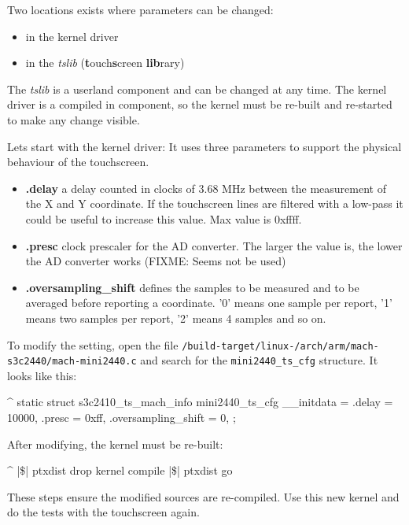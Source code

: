 Two locations exists where parameters can be changed:

\begin{itemize}
	\item in the kernel driver
	\item in the \textit{tslib} (\textbf{t}ouch\textbf{s}creen \textbf{lib}rary)
\end{itemize}

The \textit{tslib} is a userland component and can be changed at any time.
The kernel driver is a compiled in component, so the kernel must be re-built
and re-started to make any change visible.

Lets start with the kernel driver: It uses three parameters to support the
physical behaviour of the touchscreen.

\begin{itemize}
	\item \textbf{.delay} a delay counted in clocks of 3.68 MHz between
		the measurement of the X and Y coordinate. If the touchscreen
		lines are filtered with a low-pass it could be useful to
		increase this value. Max value is 0xffff.
	\item \textbf{.presc} clock prescaler for the AD converter. The larger the
		value is, the lower the AD converter works (FIXME: Seems not be
		used)
	\item \textbf{.oversampling\_shift} defines the samples to be measured and
		to be averaged before reporting a coordinate. '0' means one sample per
		report, '1' means two samples per report, '2' means 4 samples and
		so on.
\end{itemize}

To modify the setting, open the file
\texttt{\ptxdistPlatformDir /build-target/linux-\curKernelRev /arch/arm/mach-s3c2440/mach-mini2440.c}
and search for the \texttt{mini2440\_ts\_cfg} structure. It looks like this:

\begin{ptxshell}[escapechar=|]{^}
static struct s3c2410_ts_mach_info mini2440_ts_cfg __initdata = {
	.delay = 10000,
	.presc = 0xff,
	.oversampling_shift = 0,
};
\end{ptxshell}

After modifying, the kernel must be re-built:

\begin{ptxshell}[escapechar=|]{^}
|\$| ptxdist drop kernel compile
|\$| ptxdist go
\end{ptxshell}

These steps ensure the modified sources are re-compiled. Use this new kernel
and do the tests with the touchscreen again.

